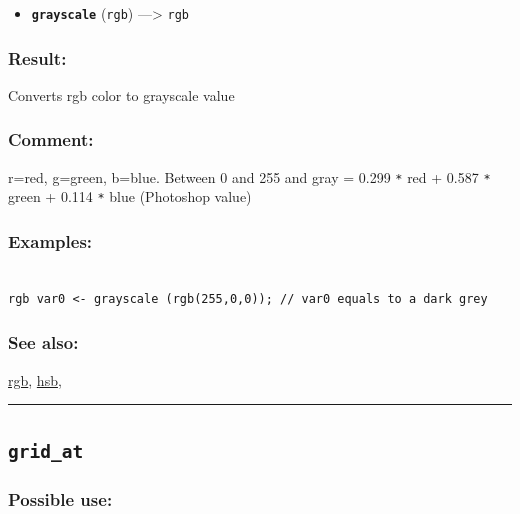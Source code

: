 \documentclass[]{book}
\providecommand{\tightlist}{%
  \setlength{\itemsep}{0pt}\setlength{\parskip}{0pt}}
\theoremstyle{definition}
\theoremstyle{definition}
\theoremstyle{definition}
\theoremstyle{remark}
\begin{document}
\begin{itemize}
\tightlist
\item
  \textbf{\texttt{grayscale}} (\texttt{rgb}) ---\textgreater{}
  \texttt{rgb}
\end{itemize}

\subsubsection{Result:}\label{result-231}

Converts rgb color to grayscale value

\subsubsection{Comment:}\label{comment-44}

r=red, g=green, b=blue. Between 0 and 255 and gray = 0.299 \texttt{*}
red + 0.587 \texttt{*} green + 0.114 \texttt{*} blue (Photoshop value)

\subsubsection{Examples:}\label{examples-181}

\begin{verbatim}
 
rgb var0 <- grayscale (rgb(255,0,0)); // var0 equals to a dark grey
\end{verbatim}

\subsubsection{See also:}\label{see-also-108}

\href{operators-n-to-r.html\#rgb}{rgb},
\href{operators-d-to-h.html\#hsb}{hsb},

\begin{center}\rule{0.5\linewidth}{\linethickness}\end{center}

\subsection{\texorpdfstring{\texttt{grid\_at}}{grid\_at}}\label{grid_at}

\subsubsection{Possible use:}\label{possible-use-241}
\end{document}
